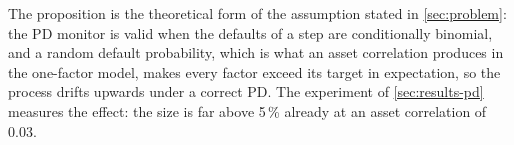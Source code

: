 The proposition is the theoretical form of the assumption stated in \cref{sec:problem}: the PD monitor is valid when the defaults of a step are conditionally binomial, and a random default probability, which is what an asset correlation produces in the one-factor model, makes every factor exceed its target in expectation, so the process drifts upwards under a correct PD.
The experiment of \cref{sec:results-pd} measures the effect: the size is far above 5\,\% already at an asset correlation of $0.03$.
